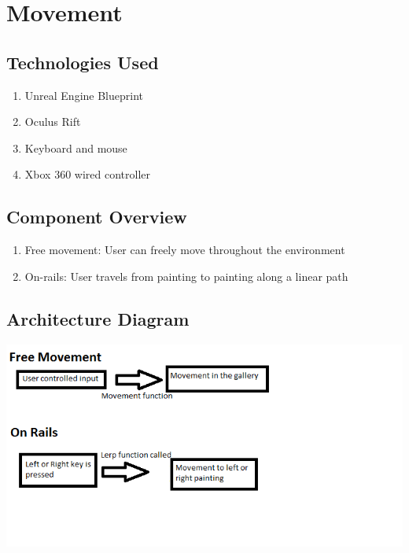 \section{ Movement }

\subsection{Technologies  Used}
\begin{enumerate}
	\item Unreal Engine Blueprint
	\item Oculus Rift
	\item Keyboard and mouse
	\item Xbox 360 wired controller
\end{enumerate}

\subsection{Component  Overview}

\begin{enumerate}
	\item Free movement:  User can freely move throughout the environment
	\item On-rails:  User travels from painting to painting along a linear path
\end{enumerate}


\subsection{ Architecture  Diagram}
\includegraphics[scale=1.0]{Diagrams/MovementDiagram.png}


